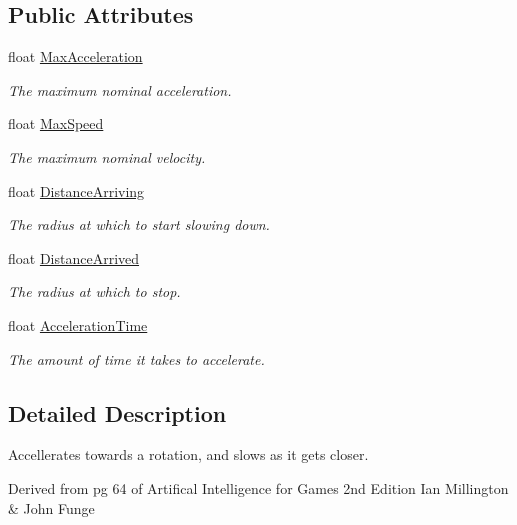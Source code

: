\subsection*{Public Attributes}
\begin{DoxyCompactItemize}
\item 
float \hyperlink{class_skyrates_1_1_common_1_1_a_i_1_1_align_a988e919f26229016a5be5d75a4a255c4}{Max\-Acceleration}
\begin{DoxyCompactList}\small\item\em The maximum nominal acceleration. \end{DoxyCompactList}\item 
float \hyperlink{class_skyrates_1_1_common_1_1_a_i_1_1_align_a9eaa68127197df193b1ce3cd99492862}{Max\-Speed}
\begin{DoxyCompactList}\small\item\em The maximum nominal velocity. \end{DoxyCompactList}\item 
float \hyperlink{class_skyrates_1_1_common_1_1_a_i_1_1_align_ad66a5eb87b1ae47307ccfe8b7c33ce18}{Distance\-Arriving}
\begin{DoxyCompactList}\small\item\em The radius at which to start slowing down. \end{DoxyCompactList}\item 
float \hyperlink{class_skyrates_1_1_common_1_1_a_i_1_1_align_a5edf3eb4764db7b95780b13ea635b4f0}{Distance\-Arrived}
\begin{DoxyCompactList}\small\item\em The radius at which to stop. \end{DoxyCompactList}\item 
float \hyperlink{class_skyrates_1_1_common_1_1_a_i_1_1_align_ad68c62b0c7bea0bd95caefbc1ce53a95}{Acceleration\-Time}
\begin{DoxyCompactList}\small\item\em The amount of time it takes to accelerate. \end{DoxyCompactList}\end{DoxyCompactItemize}


\subsection{Detailed Description}
Accellerates towards a rotation, and slows as it gets closer. 

Derived from pg 64 of Artifical Intelligence for Games 2nd Edition Ian Millington \& John Funge 

